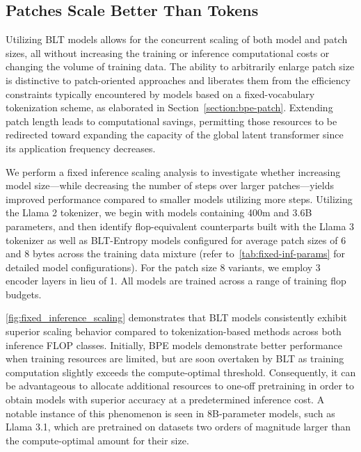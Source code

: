 \subsection{Patches Scale Better Than Tokens} Utilizing {\textsc BLT} models allows for the concurrent scaling of both model and patch sizes, all without increasing the training or inference computational costs or changing the volume of training data. The ability to arbitrarily enlarge patch size is distinctive to patch-oriented approaches and liberates them from the efficiency constraints typically encountered by models based on a fixed-vocabulary tokenization scheme, as elaborated in Section~\ref{section:bpe-patch}. Extending patch length leads to computational savings, permitting those resources to be redirected toward expanding the capacity of the global latent transformer since its application frequency decreases.

We perform a fixed inference scaling analysis to investigate whether increasing model size—while decreasing the number of steps over larger patches—yields improved performance compared to smaller models utilizing more steps. Utilizing the Llama 2 tokenizer, we begin with models containing 400m and 3.6B parameters, and then identify flop-equivalent counterparts built with the Llama 3 tokenizer as well as {\textsc BLT}-Entropy models configured for average patch sizes of 6 and 8 bytes across the training data mixture (refer to~\autoref{tab:fixed-inf-params} for detailed model configurations). For the patch size 8 variants, we employ 3 encoder layers in lieu of 1. All models are trained across a range of training flop budgets.

\autoref{fig:fixed_inference_scaling} demonstrates that {\textsc BLT} models consistently exhibit superior scaling behavior compared to tokenization-based methods across both inference FLOP classes. Initially, BPE models demonstrate better performance when training resources are limited, but are soon overtaken by {\textsc BLT} as training computation slightly exceeds the compute-optimal threshold. Consequently, it can be advantageous to allocate additional resources to one-off pretraining in order to obtain models with superior accuracy at a predetermined inference cost. A notable instance of this phenomenon is seen in 8B-parameter models, such as Llama 3.1, which are pretrained on datasets two orders of magnitude larger than the compute-optimal amount for their size.


